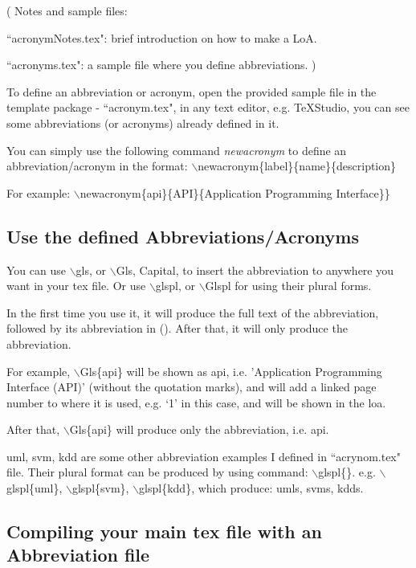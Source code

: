 ( Notes and sample files:

``acronymNotes.tex": brief introduction on how to make a LoA. 
 
 ``acronyms.tex": a sample file where you define abbreviations.
)

To define an abbreviation or acronym, open the provided sample file in the template package - ``acronym.tex",  in any text editor, e.g. TeXStudio, you can see some abbreviations (or acronyms) already defined in it.

You can simply use the following command \emph{newacronym} to define an abbreviation/acronym 
in the format: $\backslash$newacronym\{label\}\{name\}\{description\}

For example:  
$\backslash$newacronym\{api\}\{API\}\{Application Programming Interface\}\} 
 
\subsection{Use the defined Abbreviations/Acronyms}


You can use $\backslash$gls, or  $\backslash$Gls, Capital, to insert the abbreviation to anywhere you want in your tex file. 
Or use $\backslash$glspl, or  $\backslash$Glspl for using their plural forms. 

In the first time you use it, it will produce the full text of the abbreviation, followed by its abbreviation in (). After that, it will only produce the abbreviation.   

For example,      
$\backslash$Gls\{api\} 
 will be shown as \gls{api}, i.e. 'Application Programming Interface (API)' 
(without the quotation marks), 
and will add a linked page number to where it is used, e.g. `1' in this case, and will be shown in the \gls{loa}. 

After that, $\backslash$Gls\{api\} will produce only the abbreviation, i.e. \gls{api}.

\gls{uml}, \gls{svm}, \gls{kdd} are some other abbreviation examples I defined in ``acrynom.tex" file. Their plural format can be produced by using command: $\backslash$glspl\{\}.
 e.g.  $\backslash$glspl\{uml\}, $\backslash$glspl\{svm\},  $\backslash$glspl\{kdd\}, which produce:   
    \glspl{uml}, \glspl{svm}, \glspl{kdd}.  

\subsection{Compiling your main tex file with an Abbreviation file}

